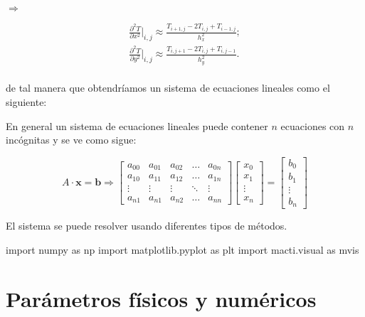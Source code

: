 \documentclass[
  letterpaper,
  DIV=11,
  numbers=noendperiod]{scrreprt}
\newenvironment{Shaded}{\begin{snugshade}}{\end{snugshade}}
\newcommand{\ImportTok}[1]{\textcolor[rgb]{0.00,0.46,0.62}{#1}}
\newcommand{\NormalTok}[1]{\textcolor[rgb]{0.00,0.23,0.31}{#1}}
\begin{document}
\(\Longrightarrow\)

\[
\begin{eqnarray}
    \frac{\partial^2 T}{\partial x^2}\Big|_{i,j} \approx \frac{T_{i+1,j} - 2 T_{i,j} + T_{i-1,j}}{h_x^2}; \\
    \frac{\partial^2 T}{\partial y^2}\Big|_{i,j} \approx \frac{T_{i,j+1} - 2 T_{i,j} + T_{i,j-1}}{h_y^2}.
\end{eqnarray}
\]\\

de tal manera que obtendríamos un sistema de ecuaciones lineales como el
siguiente:

En general un sistema de ecuaciones lineales puede contener \(n\)
ecuaciones con \(n\) incógnitas y se ve como sigue:

\[
A \cdot \mathbf{x} = \mathbf{b} \Longrightarrow
\left[
\begin{array}{ccccc}
a_{00} & a_{01} & a_{02} & \dots & a_{0n} \\
a_{10} & a_{11} & a_{12} & \dots & a_{1n} \\
\vdots & \vdots & \vdots & \ddots & \vdots \\
a_{n1} & a_{n1} & a_{n2} & \dots & a_{nn}
\end{array} \right] 
\left[
\begin{array}{cccc}
x_{0} \\ x_{1} \\ \vdots \\ x_{n}
\end{array} \right] 
=
\left[
\begin{array}{c}
b_0 \\ b_1 \\ \vdots \\ b_{n}
\end{array}
\right]
\]

El sistema se puede resolver usando diferentes tipos de métodos.

\begin{Shaded}
\begin{Highlighting}[]
\ImportTok{import}\NormalTok{ numpy }\ImportTok{as}\NormalTok{ np}
\ImportTok{import}\NormalTok{ matplotlib.pyplot }\ImportTok{as}\NormalTok{ plt}
\ImportTok{import}\NormalTok{ macti.visual }\ImportTok{as}\NormalTok{ mvis}
\end{Highlighting}
\end{Shaded}

\section{Parámetros físicos y
numéricos}\label{paruxe1metros-fuxedsicos-y-numuxe9ricos}
\end{document}
